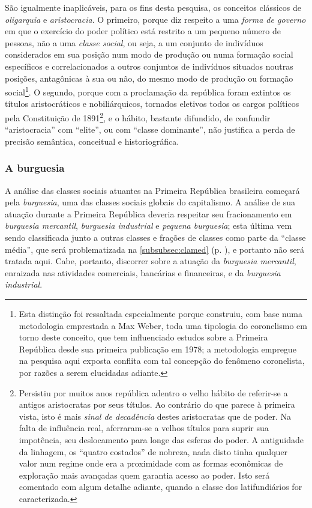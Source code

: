 São igualmente inaplicáveis, para os fins desta pesquisa, os conceitos clássicos de \textit{oligarquia} e \textit{aristocracia}. O primeiro, porque diz respeito a uma \textit{forma de governo} em que o exercício do poder político está restrito a um pequeno número de pessoas, não a uma \textit{classe social}, ou seja, a um conjunto de indivíduos considerados em sua posição num modo de produção ou numa formação social específicos e correlacionados a outros conjuntos de indivíduos situados noutras posições, antagônicas à sua ou não, do mesmo modo de produção ou formação social\footnote{Esta distinção foi ressaltada especialmente porque  construiu, com base numa metodologia emprestada a Max Weber, toda uma tipologia do coronelismo em torno deste conceito, que tem influenciado estudos sobre a Primeira República desde sua primeira publicação em 1978; a metodologia empregue na pesquisa aqui exposta conflita com tal concepção do fenômeno coronelista, por razões a serem elucidadas adiante.}. O segundo, porque com a proclamação da república foram extintos os títulos aristocráticos e nobiliárquicos, tornados eletivos todos os cargos políticos pela Constituição de 1891\footnote{Persistiu por muitos anos república adentro o velho hábito de referir-se a antigos aristocratas por seus títulos. Ao contrário do que parece à primeira vista, isto é mais \textit{sinal de decadência} destes aristocratas que de poder. Na falta de influência real, aferraram-se a velhos títulos para suprir sua impotência, seu deslocamento para longe das esferas do poder. A antiguidade da linhagem, os ``quatro costados'' de nobreza, nada disto tinha qualquer valor num regime onde era a proximidade com as formas econômicas de exploração mais avançadas quem garantia acesso ao poder. Isto será comentado com algum detalhe adiante, quando a classe dos latifundiários for caracterizada.}, e o hábito, bastante difundido, de confundir ``aristocracia'' com ``elite'', ou com ``classe dominante'', não justifica a perda de precisão semântica, conceitual e historiográfica.

\subsubsection{A burguesia}\label{subsubsec:claburg}

A análise das classes sociais atuantes na Primeira República brasileira começará pela \textit{burguesia}, uma das classes sociais globais do capitalismo. A análise de sua atuação durante a Primeira República deveria respeitar seu fracionamento em \textit{burguesia mercantil}, \textit{burguesia industrial} e \textit{pequena burguesia}; esta última vem sendo classificada junto a outras classes e frações de classes como parte da ``classe média'', que será problematizada na \autoref{subsubsec:clamed} (p. \pageref{subsubsec:clamed}), e portanto não será tratada aqui. Cabe, portanto, discorrer sobre a atuação da \textit{burguesia mercantil}, enraizada nas atividades comerciais, bancárias e financeiras, e da \textit{burguesia industrial}.

